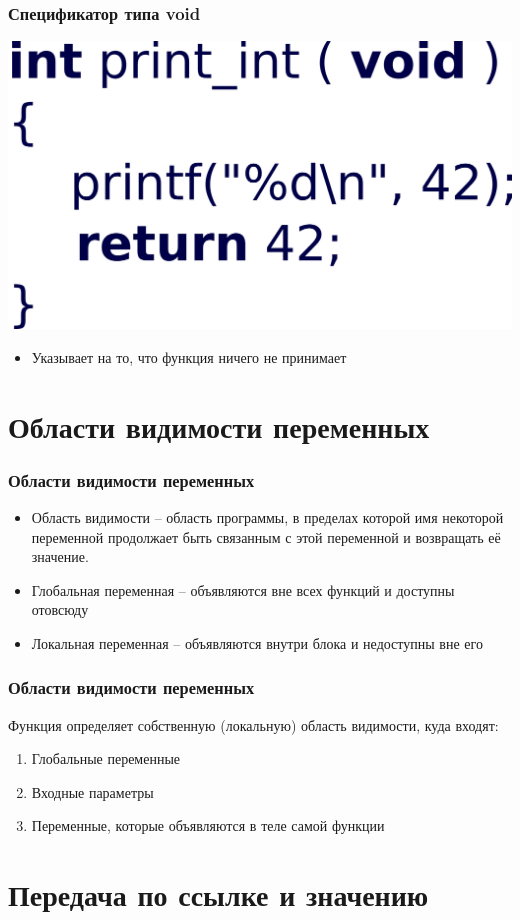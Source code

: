 \documentclass[12pt,pdf,hyperref={unicode}]{beamer}
\begin{document}
\begin{frame}[fragile]
\frametitle{Спецификатор типа void} 
\begin{center}
\includegraphics[width=0.45\linewidth]{images/function_void2.png}
\end{center}
\begin{itemize}
\item Указывает на то, что функция ничего не принимает
\end{itemize}
\end{frame}


\section{Области видимости переменных}

\begin{frame}[fragile]
\frametitle{Области видимости переменных} 
\begin{itemize}
\item Область видимости -- область программы, в пределах которой имя некоторой переменной продолжает быть связанным с этой переменной и возвращать её значение.
\item Глобальная переменная -- объявляются вне всех функций и доступны отовсюду
\item Локальная переменная --  объявляются внутри блока и недоступны вне его
\end{itemize}
\end{frame}

\begin{frame}[fragile]
\frametitle{Области видимости переменных} 
Функция определяет собственную (локальную) область видимости, куда входят:
\begin{enumerate}
\item Глобальные переменные
\item Входные параметры
\item Переменные, которые объявляются в теле самой функции
\end{enumerate}
\end{frame}



\section{Передача по ссылке и значению}
\end{document}
